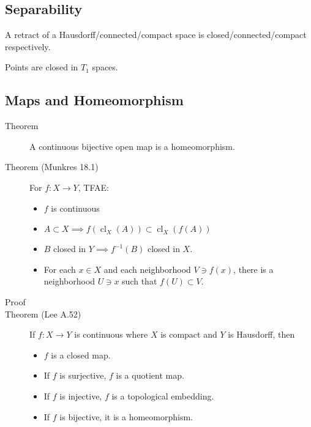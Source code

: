 \hypertarget{separability-1}{%
\subsection{Separability}\label{separability-1}}

\begin{description}
\tightlist
\item[Proposition]
A retract of a Hausdorff/connected/compact space is
closed/connected/compact respectively.
\item[Theorem]
Points are closed in \(T_1\) spaces.
\end{description}

\hypertarget{maps-and-homeomorphism}{%
\subsection{Maps and Homeomorphism}\label{maps-and-homeomorphism}}

\begin{description}
\item[Theorem]
A continuous bijective open map is a homeomorphism.
\item[Theorem (Munkres 18.1)]
For \(f:X\to Y\), TFAE:

\begin{itemize}
\tightlist
\item
  \(f\) is continuous
\item
  \(A\subset X \implies f(\operatorname{cl}_X(A)) \subset \operatorname{cl}_X(f(A))\)
\item
  \(B\) closed in \(Y \implies f^{-1}(B)\) closed in \(X\).
\item
  For each \(x\in X\) and each neighborhood \(V \ni f(x)\), there is a
  neighborhood \(U\ni x\) such that \(f(U) \subset V\).
\end{itemize}
\item[Proof]
\item[Theorem (Lee A.52)]
If \(f:X\to Y\) is continuous where \(X\) is compact and \(Y\) is
Hausdorff, then

\begin{itemize}
\tightlist
\item
  \(f\) is a closed map.
\item
  If \(f\) is surjective, \(f\) is a quotient map.
\item
  If \(f\) is injective, \(f\) is a topological embedding.
\item
  If \(f\) is bijective, it is a homeomorphism.
\end{itemize}
\end{description}

